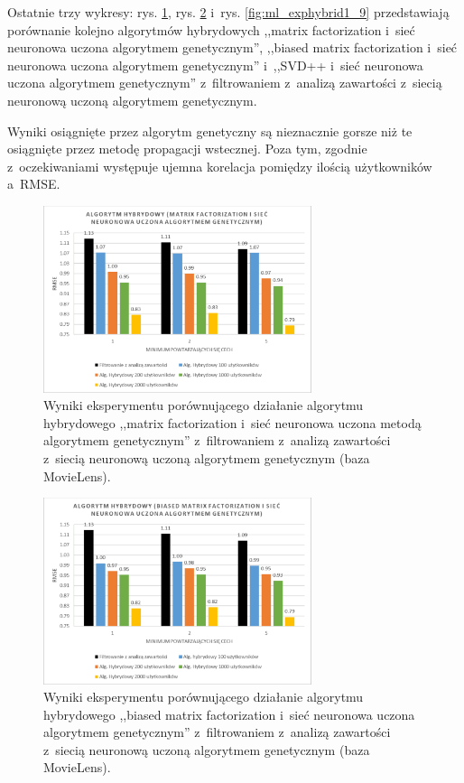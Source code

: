\documentclass[twoside]{iisthesis}
\begin{document}
		Ostatnie trzy wykresy: rys. \ref{fig:ml_exphybrid1_7}, rys. \ref{fig:ml_exphybrid1_8} i~rys. \ref{fig:ml_exphybrid1_9} przedstawiają porównanie kolejno algorytmów hybrydowych ,,matrix factorization i~sieć neuronowa uczona algorytmem genetycznym'', ,,biased matrix factorization i~sieć neuronowa uczona algorytmem genetycznym'' i~,,SVD++ i~sieć neuronowa uczona algorytmem genetycznym'' z~filtrowaniem z~analizą zawartości z~siecią neuronową uczoną algorytmem genetycznym.
		
		Wyniki osiągnięte przez algorytm genetyczny są nieznacznie gorsze niż te osiągnięte przez metodę propagacji wstecznej. Poza tym, zgodnie z~oczekiwaniami występuje ujemna korelacja pomiędzy ilością użytkowników a~RMSE.
		
			\begin{figure}
			\centering
			\includegraphics[width=0.7\textwidth]{ml_exphybrid1_7}			
			\caption{Wyniki eksperymentu porównującego działanie algorytmu hybrydowego ,,matrix factorization i~sieć neuronowa uczona metodą algorytmem genetycznym'' z~filtrowaniem z~analizą zawartości z~siecią neuronową uczoną algorytmem genetycznym (baza MovieLens).}
			\label{fig:ml_exphybrid1_7}
		\end{figure}
		
		\begin{figure}
			\centering
			\includegraphics[width=0.7\textwidth]{ml_exphybrid1_8}			
			\caption{Wyniki eksperymentu porównującego działanie algorytmu hybrydowego ,,biased matrix factorization i~sieć neuronowa uczona algorytmem genetycznym'' z~filtrowaniem z~analizą zawartości z~siecią neuronową uczoną algorytmem genetycznym (baza MovieLens).}
			\label{fig:ml_exphybrid1_8}
		\end{figure}
		
\end{document}
